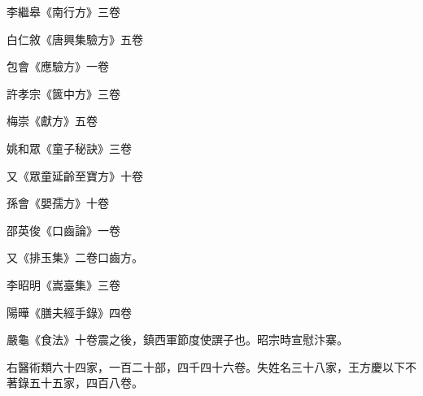 \begin{pinyinscope}
 李繼皋《南行方》三卷



 白仁敘《唐興集驗方》五卷



 包會《應驗方》一卷



 許孝宗《篋中方》三卷



 梅崇《獻方》五卷



 姚和眾《童子秘訣》三卷



 又《眾童延齡至寶方》十卷



 孫會《嬰孺方》十卷



 邵英俊《口齒論》一卷



 又《排玉集》二卷口齒方。



 李昭明《嵩臺集》三卷



 陽曄《膳夫經手錄》四卷



 嚴龜《食法》十卷震之後，鎮西軍節度使譔子也。昭宗時宣慰汴寨。



 右醫術類六十四家，一百二十部，四千四十六卷。失姓名三十八家，王方慶以下不著錄五十五家，四百八卷。



\end{pinyinscope}